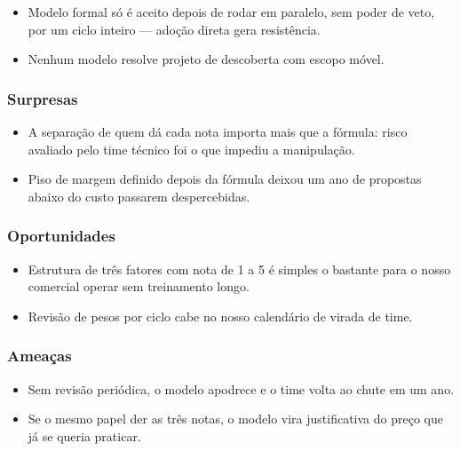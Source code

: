 \begin{itemize}
  \item Modelo formal só é aceito depois de rodar em paralelo, sem poder de veto, por um ciclo inteiro — adoção direta gera resistência.
  \item Nenhum modelo resolve projeto de descoberta com escopo móvel.
\end{itemize}

\subsubsection{Surpresas}

\begin{itemize}
  \item A separação de quem dá cada nota importa mais que a fórmula: risco avaliado pelo time técnico foi o que impediu a manipulação.
  \item Piso de margem definido depois da fórmula deixou um ano de propostas abaixo do custo passarem despercebidas.
\end{itemize}

\subsubsection{Oportunidades}

\begin{itemize}
  \item Estrutura de três fatores com nota de 1 a 5 é simples o bastante para o nosso comercial operar sem treinamento longo.
  \item Revisão de pesos por ciclo cabe no nosso calendário de virada de time.
\end{itemize}

\subsubsection{Ameaças}

\begin{itemize}
  \item Sem revisão periódica, o modelo apodrece e o time volta ao chute em um ano.
  \item Se o mesmo papel der as três notas, o modelo vira justificativa do preço que já se queria praticar.
\end{itemize}

